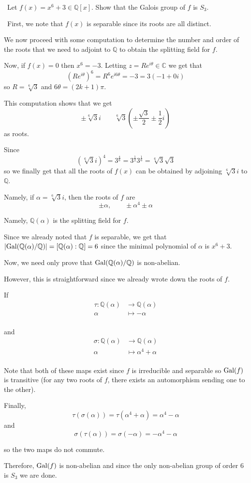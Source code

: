 \documentclass[12pt]{AlgebraQual}
\begin{document}
\begin{problem} $\,$
Let $f(x)=x^6+3\in\mathbb{Q}[x].$ Show that the Galois group of $f$ is $S_3$.
\end{problem}


\begin{solution}$\,$
First, we note that $f(x)$ is separable since its roots are all distinct.

We now proceed with some computation to determine the number and order of the roots that we need to adjoint to $\mathbb{Q}$ to obtain the splitting field for $f$.

Now, if $f(x)=0$ then $x^6=-3$. Letting $z=Re^{i\theta}\in\mathbb{C}$ we get that $$(Re^{i\theta})^6=R^6e^{i6\theta}=-3=3(-1+0i)$$ so $R=\sqrt[6]{3}$ and $6\theta=(2k+1)\pi.$

This computation shows that we get $$\pm\sqrt[6]{3}i\qquad \sqrt[6]{3}\left(\pm\frac{\sqrt{3}}{2}\pm\frac{1}{2}i\right)$$ as roots.

Since $$(\sqrt[6]{3}i)^4=3^{\frac{4}{6}}=3^{\frac{1}{2}}3^{\frac{1}{6}}=\sqrt[6]{3}\sqrt{3}$$ so we finally get that all the roots of $f(x)$ can be obtained by adjoining $\sqrt[6]{3}i$ to $\mathbb{Q}$.

Namely, if $\alpha=\sqrt[6]{3}i$, then the roots of $f$ are $$\pm \alpha,\qquad \pm \alpha^4\pm \alpha$$

Namely, $\mathbb{Q}(\alpha)$ is the splitting field for $f$.

Since we already noted that $f$ is separable, we get that $|\text{Gal}(\mathbb{Q}(\alpha)/\mathbb{Q})|=[\mathbb{Q}(\alpha):\mathbb{Q}]=6$ since the minimal polynomial of $\alpha$ is $x^6+3.$

Now, we need only prove that $\text{Gal}(\mathbb{Q}(\alpha)/\mathbb{Q})$ is non-abelian.

However, this is straightforward since we already wrote down the roots of $f$.

If \begin{align*}
    \tau:\mathbb{Q}(\alpha)&\to\mathbb{Q}(\alpha)\\
    \alpha&\mapsto -\alpha\\
\end{align*}

and \begin{align*}
    \sigma:\mathbb{Q}(\alpha)&\to\mathbb{Q}(\alpha)\\
    \alpha&\mapsto \alpha^4+\alpha\\
\end{align*}

Note that both of these maps exist since $f$ is irreducible and separable so $\text{Gal}(f)$ is transitive (for any two roots of $f$, there exists an automorphism sending one to the other).

Finally, $$\tau(\sigma(\alpha))=\tau(\alpha^4+\alpha)=\alpha^4-\alpha$$ and $$\sigma(\tau(\alpha))=\sigma(-\alpha)=-\alpha^4-\alpha$$

so the two maps do not commute.

Therefore, $\text{Gal}(f)$ is non-abelian and since the only non-abelian group of order $6$ is $S_3$ we are done.


\end{solution}
\newpage
\end{document}
